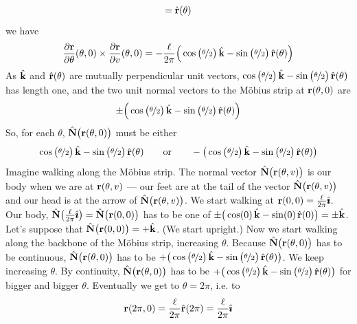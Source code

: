 \begin{eg}
\begin{align*}
=\hat{\mathbf{r}}(\theta)
\end{align*}
we have
\begin{align*}
\frac{\partial\mathbf{r}}{\partial\theta}(\theta,0) \times 
\frac{\partial\mathbf{r}}{\partial v}(\theta,0)
=-\frac{\ell}{2\pi}\Big(\cos\big(\nicefrac{\theta}{2}\big)\,\hat{\mathbf{k}}
                       -\sin\big(\nicefrac{\theta}{2}\big)\,\hat{\mathbf{r}}(\theta) \Big)
\end{align*}
As $\hat{\mathbf{k}}$ and $\hat{\mathbf{r}}(\theta)$ are mutually perpendicular unit vectors,
$\cos\big(\nicefrac{\theta}{2}\big)\,\hat{\mathbf{k}}
                       -\sin\big(\nicefrac{\theta}{2}\big)\,\hat{\mathbf{r}}(\theta)$ 
has length one, and the two unit normal vectors to the M\"obius strip
at $\mathbf{r}(\theta,0)$ are
\begin{equation*}
\pm \Big(\cos\big(\nicefrac{\theta}{2}\big)\,\hat{\mathbf{k}}
                       -\sin\big(\nicefrac{\theta}{2}\big)\,\hat{\mathbf{r}}(\theta) \Big)
\end{equation*}
So, for each $\theta$, $\hat{\mathbf{N}}\big(\mathbf{r}(\theta,0)\big)$ must be either 
\begin{equation*}
\cos\big(\nicefrac{\theta}{2}\big)\,\hat{\mathbf{k}}
                       -\sin\big(\nicefrac{\theta}{2}\big)\,\hat{\mathbf{r}}(\theta)
\qquad\text{or}\qquad 
-\big(\cos\big(\nicefrac{\theta}{2}\big)\,\hat{\mathbf{k}}
                       -\sin\big(\nicefrac{\theta}{2}\big)\,\hat{\mathbf{r}}(\theta) \big)
\end{equation*}
Imagine walking along the M\"obius strip.
The normal vector $\hat{\mathbf{N}}\big(\mathbf{r}(\theta,v)\big)$ is our body when we are 
at $\mathbf{r}(\theta,v)$ --- our feet are at the tail of the vector 
$\hat{\mathbf{N}}\big(\mathbf{r}(\theta,v)\big)$ and our head is at the arrow of 
$\hat{\mathbf{N}}\big(\mathbf{r}(\theta,v)\big)$. We start walking at 
$\mathbf{r}(0,0)=\frac{\ell}{2\pi}\hat{\pmb{\imath}}$. Our body,
$\hat{\mathbf{N}}\big(\frac{\ell}{2\pi}\hat{\pmb{\imath}}\big)=\hat{\mathbf{N}}\big(\mathbf{r}(0,0)\big)$ has to be one of 
$\pm \big(\cos(0)\,\hat{\mathbf{k}}-\sin(0)\,\hat{\mathbf{r}}(0) \big)=\pm\hat{\mathbf{k}}$. 
Let's suppose that $\hat{\mathbf{N}}\big(\mathbf{r}(0,0)\big)=+\hat{\mathbf{k}}$. (We start upright.)
Now we start walking along the backbone of the M\"obius strip, 
increasing $\theta$. Because $\hat{\mathbf{N}}\big(\mathbf{r}(\theta,0)\big)$ has to be continuous, 
$\hat{\mathbf{N}}\big(\mathbf{r}(\theta,0)\big)$ has to be 
$+\big(\cos\big(\nicefrac{\theta}{2}\big)\,\hat{\mathbf{k}}
                       -\sin\big(\nicefrac{\theta}{2}\big)\,\hat{\mathbf{r}}(\theta) \big)$.
We keep increasing $\theta$. By continuity, $\hat{\mathbf{N}}\big(\mathbf{r}(\theta,0)\big)$ has to be 
$+\big(\cos\big(\nicefrac{\theta}{2}\big)\,\hat{\mathbf{k}}
                       -\sin\big(\nicefrac{\theta}{2}\big)\,\hat{\mathbf{r}}(\theta) \big)$
for bigger and bigger $\theta$. Eventually we get to $\theta=2\pi$, i.e. to
\begin{equation*}
\vr(2\pi,0)= \frac{\ell}{2\pi}\hr(2\pi) =  \frac{\ell}{2\pi}\hi

\end{equation*}
\end{eg}
